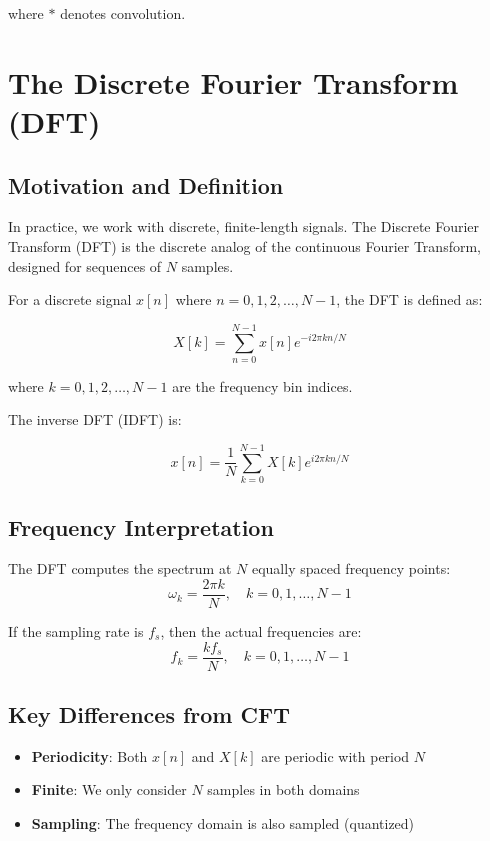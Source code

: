 \documentclass[11pt,a4paper]{article}
\begin{document}
where $*$ denotes convolution.

\section{The Discrete Fourier Transform (DFT)}

\subsection{Motivation and Definition}

In practice, we work with discrete, finite-length signals. The Discrete Fourier Transform (DFT) is the discrete analog of the continuous Fourier Transform, designed for sequences of $N$ samples.

For a discrete signal $x[n]$ where $n = 0, 1, 2, \ldots, N-1$, the DFT is defined as:

\begin{equation}
X[k] = \sum_{n=0}^{N-1} x[n] e^{-i 2\pi k n / N}
\end{equation}

where $k = 0, 1, 2, \ldots, N-1$ are the frequency bin indices.

The inverse DFT (IDFT) is:

\begin{equation}
x[n] = \frac{1}{N} \sum_{k=0}^{N-1} X[k] e^{i 2\pi k n / N}
\end{equation}

\subsection{Frequency Interpretation}

The DFT computes the spectrum at $N$ equally spaced frequency points:
\begin{equation}
\omega_k = \frac{2\pi k}{N}, \quad k = 0, 1, \ldots, N-1
\end{equation}

If the sampling rate is $f_s$, then the actual frequencies are:
\begin{equation}
f_k = \frac{k f_s}{N}, \quad k = 0, 1, \ldots, N-1
\end{equation}

\subsection{Key Differences from CFT}

\begin{itemize}
    \item \textbf{Periodicity}: Both $x[n]$ and $X[k]$ are periodic with period $N$
    \item \textbf{Finite}: We only consider $N$ samples in both domains
    \item \textbf{Sampling}: The frequency domain is also sampled (quantized)
\end{itemize}
\end{document}
